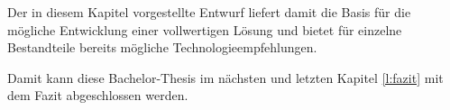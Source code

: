 Der in diesem Kapitel vorgestellte Entwurf liefert damit die Basis für die mögliche Entwicklung einer vollwertigen Lösung und bietet für einzelne Bestandteile bereits mögliche Technologieempfehlungen.

\secbar

Damit kann diese Bachelor-Thesis im nächsten und letzten Kapitel \ref{l:fazit} mit dem Fazit abgeschlossen werden.

\pagebreak
